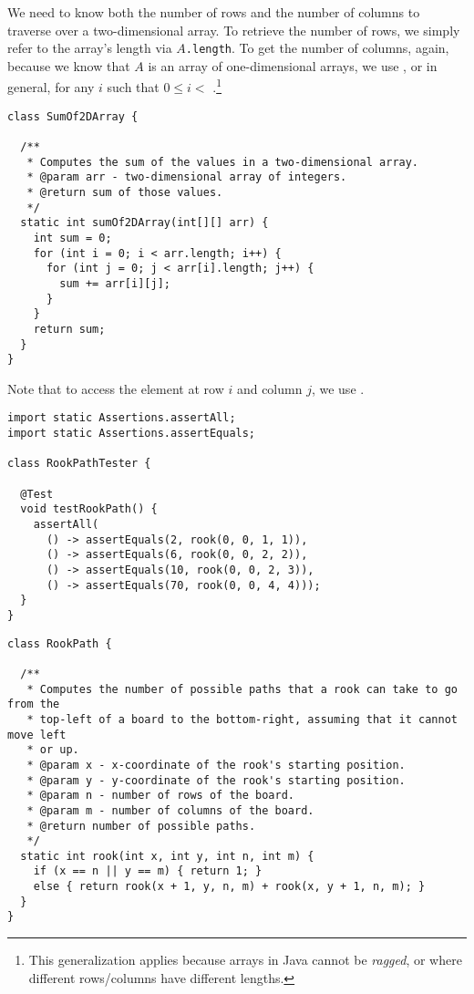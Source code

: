We need to know both the number of rows and the number of columns to traverse over a two-dimensional array. To retrieve the number of rows, we simply refer to the array's length via \texttt{$A$.length}. To get the number of columns, again, because we know that $A$ is an array of one-dimensional arrays, we use , or in general,  for any $i$ such that $0 \leq i< $ .\footnote{This generalization applies because arrays in Java cannot be \emph{ragged}, or where different rows/columns have different lengths.}

\begin{lstlisting}[language=MyJava]
class SumOf2DArray {

  /**
   * Computes the sum of the values in a two-dimensional array.
   * @param arr - two-dimensional array of integers.
   * @return sum of those values.
   */
  static int sumOf2DArray(int[][] arr) {
    int sum = 0;
    for (int i = 0; i < arr.length; i++) {
      for (int j = 0; j < arr[i].length; j++) {
        sum += arr[i][j];
      }
    }
    return sum;
  }
}
\end{lstlisting}

Note that to access the element at row $i$ and column $j$, we use . 


\begin{lstlisting}[language=MyJava]
import static Assertions.assertAll;
import static Assertions.assertEquals;

class RookPathTester {

  @Test
  void testRookPath() {
    assertAll(
      () -> assertEquals(2, rook(0, 0, 1, 1)),
      () -> assertEquals(6, rook(0, 0, 2, 2)),
      () -> assertEquals(10, rook(0, 0, 2, 3)),
      () -> assertEquals(70, rook(0, 0, 4, 4)));
  }
}
\end{lstlisting}

\begin{lstlisting}[language=MyJava]
class RookPath {

  /**
   * Computes the number of possible paths that a rook can take to go from the
   * top-left of a board to the bottom-right, assuming that it cannot move left
   * or up.
   * @param x - x-coordinate of the rook's starting position.
   * @param y - y-coordinate of the rook's starting position.
   * @param n - number of rows of the board.
   * @param m - number of columns of the board.
   * @return number of possible paths.
   */
  static int rook(int x, int y, int n, int m) {
    if (x == n || y == m) { return 1; }
    else { return rook(x + 1, y, n, m) + rook(x, y + 1, n, m); }
  }
}
\end{lstlisting}

